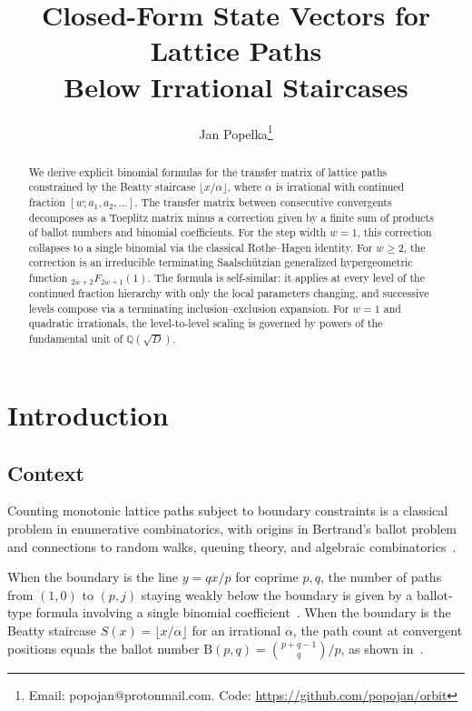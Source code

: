 \documentclass[11pt]{article}
\title{Closed-Form State Vectors for Lattice Paths\\
Below Irrational Staircases}
\author{Jan Popelka\thanks{Email: popojan@protonmail.com.
Code: \url{https://github.com/popojan/orbit}}}
\date{}
\theoremstyle{definition}
\theoremstyle{remark}
\newcommand{\floor}[1]{\lfloor #1 \rfloor}
\newcommand{\B}{\mathrm{B}}
\newcommand{\pFq}[2]{{}_{#1}F_{#2}}
\begin{document}
\maketitle

\begin{abstract}
We derive explicit binomial formulas for the transfer matrix of
lattice paths constrained by the Beatty staircase
$\floor{x/\alpha}$, where $\alpha$ is irrational with continued
fraction $[w; a_1, a_2, \ldots]$.
The transfer matrix between consecutive convergents decomposes as
a Toeplitz matrix minus a correction given by a finite sum of
products of ballot numbers and binomial coefficients.
For the step width $w = 1$, this correction collapses to a single
binomial via the classical Rothe--Hagen identity.
For $w \geq 2$, the correction is an irreducible terminating
Saalsch\"utzian generalized hypergeometric function
$\pFq{2w+2}{2w+1}(1)$.
The formula is self-similar: it applies at every level of the
continued fraction hierarchy with only the local parameters
changing, and successive levels compose via a terminating
inclusion--exclusion expansion.
For $w = 1$ and quadratic irrationals, the level-to-level scaling
is governed by powers of the fundamental unit of
$\mathbb{Q}(\sqrt{D})$.
\end{abstract}

\section{Introduction}\label{sec:intro}

\subsection{Context}

Counting monotonic lattice paths subject to boundary constraints is
a classical problem in enumerative combinatorics, with origins in
Bertrand's ballot problem~\cite{Andre1887} and connections to
random walks, queuing theory, and algebraic
combinatorics~\cite{Krattenthaler2015}.

When the boundary is the line $y = qx/p$ for coprime $p, q$, the
number of paths from $(1,0)$ to $(p, j)$ staying weakly below the
boundary is given by a ballot-type formula involving a single
binomial coefficient~\cite{IrvingRattan2009}.
When the boundary is the Beatty staircase
$S(x) = \floor{x/\alpha}$ for an irrational $\alpha$, the path
count at convergent positions equals the ballot number
$\B(p,q) = \binom{p+q-1}{q}/p$, as shown
in~\cite{PopelkaBeattyBallot2026}.
\end{document}
